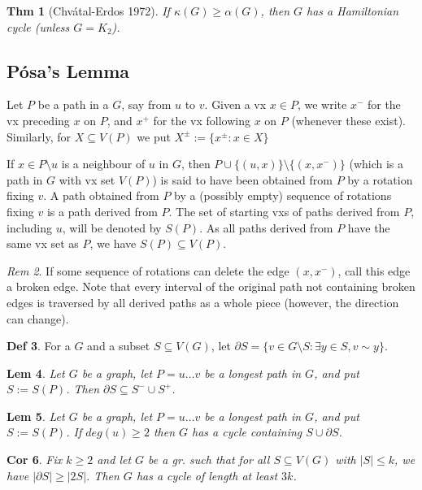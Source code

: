 \documentclass[11pt, fleqn, a4paper, landscape]{article}
\theoremstyle{plain} %
\newtheorem{thm}{Thm}
\newtheorem{lem}[thm]{Lem}
\newtheorem{cor}[thm]{Cor}
\theoremstyle{remark} %
\newtheorem{rem}[thm]{Rem}
\theoremstyle{definition} %
\newtheorem{defi}[thm]{Def}
\begin{document}
\begin{multicols}{5}
\begin{thm}[Chvátal-Erdos 1972]
If $\kappa (G)\ge\alpha(G)$, then $G$ has a Hamiltonian cycle (unless
$G = K_2$).
\end{thm}

\subsection{Pósa’s Lemma}
Let $P$ be a path in a $G$, say from $u$ to $v$. Given a vx $x \in P$, we write $x^-$ for the vx preceding $x$ on $P$, and $x^+$ for the vx following $x$ on $P$ (whenever these exist). Similarly, for $X \subseteq V (P)$ we put $X^\pm:=\{x^\pm:x\in X\}$

If $x \in P\setminus u$ is a neighbour of $u$ in $G$, then $P \cup \{(u, x)\}\setminus\{(x, x^-)\}$ (which is a path in $G$ with vx
set $V (P)$) is said to have been obtained from $P$ by a rotation fixing $v$. A path obtained from $P$ by a (possibly empty) sequence of rotations fixing $v$ is a path derived from $P$. The set of starting vxs of paths derived from $P$, including $u$, will be denoted by $S(P)$. As all paths derived from $P$ have the same vx set as $P$, we have $S(P) \subseteq V (P)$.

\begin{rem}
If some sequence of rotations can delete the edge $(x, x^-)$, call this edge a broken edge. Note that every interval of the original path not containing broken edges is traversed by all derived paths as a whole piece (however, the direction can change).
\end{rem}

\begin{defi}
For a $G$ and a subset $S \subseteq V (G)$, let $\partial S = \{v \in G\setminus S : \exists y \in  S, v\sim y\}$.
\end{defi}

\begin{lem}
Let $G$ be a graph, let $P = u \dots v$ be a longest path in $G$, and put $S := S(P)$. Then $\partial S \subseteq S^- \cup  S^+$.
\end{lem}

\begin{lem}
Let $G$ be a graph, let $P = u \dots v$ be a longest path in $G$, and put $S := S(P)$. If $deg(u) \ge 2$ then $ G$ has a cycle containing $S \cup \partial S$.
\end{lem}

\begin{cor}
Fix $k \ge 2$ and let $G$ be a gr. such that for all $S \subseteq V (G)$ with $|S|\le k$, we have $|\partial S|\ge |2S|$. Then $G$ has a cycle of length at least $3k$.
\end{cor}


\end{multicols}
\end{document}
